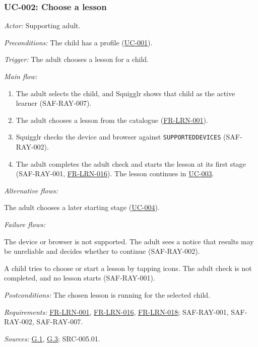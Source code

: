 \documentclass[12pt]{article}
\renewcommand{\_}{\textunderscore\allowbreak}%
\newcommand{\goalref}[1]{\hyperref[goal:#1]{G.#1}}
\newcommand{\ucref}[1]{\hyperref[uc:#1]{\mbox{UC-#1}}}
\newcommand{\reqfield}[2]{\noindent\textit{#1:} #2\par}
\newcommand{\reqref}[1]{\hyperref[req:#1]{#1}}
\providecommand{\ucref}[1]{\hyperref[uc:#1]{UC-#1}}
\begin{document}
\subsubsection{UC-002: Choose a lesson}
\label{puc:002}
\reqfield{Actor}{Supporting adult.}
\reqfield{Preconditions}{The child has a profile (\ucref{001}).}
\reqfield{Trigger}{The adult chooses a lesson for a child.}
\noindent\textit{Main flow:}
\begin{enumerate}[nosep, leftmargin=2.2em]
  \item The adult selects the child, and Squigglr shows that child as the active
  learner (\mbox{SAF-RAY-007}).
  \item The adult chooses a lesson from the catalogue
  (\mbox{\reqref{FR-LRN-001}}).
  \item Squigglr checks the device and browser against
  \texttt{SUPPORTED\_DEVICES} (\mbox{SAF-RAY-002}).
  \item The adult completes the adult check and starts the lesson at its first
  stage (\mbox{SAF-RAY-001}, \mbox{\reqref{FR-LRN-016}}). The lesson continues
  in \ucref{003}.
\end{enumerate}
\noindent\textit{Alternative flows:}
\begin{description}[nosep, leftmargin=2.2em, font=\normalfont]
  \item[4a.] The adult chooses a later starting stage (\ucref{004}).
\end{description}
\noindent\textit{Failure flows:}
\begin{description}[nosep, leftmargin=2.2em, font=\normalfont]
  \item[3a.] The device or browser is not supported. The adult sees a notice
  that results may be unreliable and decides whether to continue
  (\mbox{SAF-RAY-002}).
  \item[4b.] A child tries to choose or start a lesson by tapping icons. The
  adult check is not completed, and no lesson starts (\mbox{SAF-RAY-001}).
\end{description}
\reqfield{Postconditions}{The chosen lesson is running for the selected child.}
\reqfield{Requirements}{\mbox{\reqref{FR-LRN-001}}, \mbox{\reqref{FR-LRN-016}},
\mbox{\reqref{FR-LRN-018}}; \mbox{SAF-RAY-001}, \mbox{SAF-RAY-002},
\mbox{SAF-RAY-007}.} \reqfield{Sources}{\goalref{1}, \goalref{3};
\mbox{SRC-005.01}.}
\end{document}
